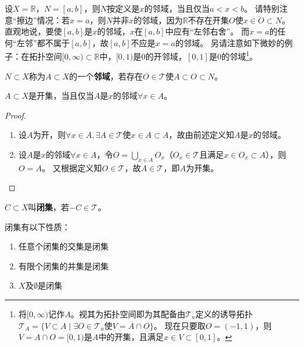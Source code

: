 \begin{note}
	设$X = \mathbb{R}$，$N = [a, b]$，则$N$按定义是$x$的邻域，当且仅当$a < x < b$。
	请特别注意``擦边''情况：若$x = a$，则$N$并非$x$的邻域，因为$\mathbb{R}$不存在开集$O$使$x \in O \subset N$。
	直观地说，要使$[a, b]$是$x$的邻域，$x$在$[a, b]$中应有``左邻右舍''。
	而$x = a$的任何``左邻''都不属于$[a, b]$，故$[a, b]$不应是$x = a$的邻域。
	另请注意如下微妙的例子：在拓扑空间$[0, \infty) \subset \mathbb{R}$中，$[0, 1)$是$0$的开邻域，$[0, 1]$是$0$的邻域\footnote{
	将$[0, \infty)$记作$A$。视其为拓扑空间即为其配备由$\mathscr{T}_u$定义的诱导拓扑$\mathscr{T}_A = \{V \subset A \mid \exists O \in \mathscr{T}_u \text{使} V = A \cap O\}$。
	现在只要取$O = (-1, 1)$，则$V = A \cap O = [0, 1)$是$A$中的开集，且满足$x \in V \subset [0, 1]$。
	}。
\end{note}

\begin{definition}
	$N \subset X$称为$A \subset X$的一个\textbf{邻域}，若存在$O \in \mathscr{T}$使$A \subset O \subset N$。
\end{definition}

\begin{theorem}
	$A \subset X$是开集，当且仅当$A$是$x$的邻域$\forall x \in A$。
\end{theorem}

\begin{proof}
	\begin{enumerate}[（A）]
		\item 设$A$为开，则$\forall x \in A, \exists A \in \mathscr{T}$使$x \in A \subset A$，故由前述定义知$A$是$x$的邻域。
		\item 设$A$是$x$的邻域$\forall x \in A$，令$O = \bigcup\limits_{x \in A}O_x$（$O_x \in \mathscr{T}$且满足$x \in O_x \subset A$），则$O = A$。
		又根据定义知$O \in \mathscr{T}$，故$A \in \mathscr{T}$，即$A$为开集。
	\end{enumerate}
\end{proof}

\begin{definition}
	$C \subset X$叫\textbf{闭集}，若$-C \in \mathscr{T}$。
\end{definition}

\begin{theorem}
	闭集有以下性质：
	\begin{enumerate}[（a）]
		\item 任意个闭集的交集是闭集
		\item 有限个闭集的并集是闭集
		\item $X$及$\emptyset$是闭集
	\end{enumerate}
\end{theorem}

